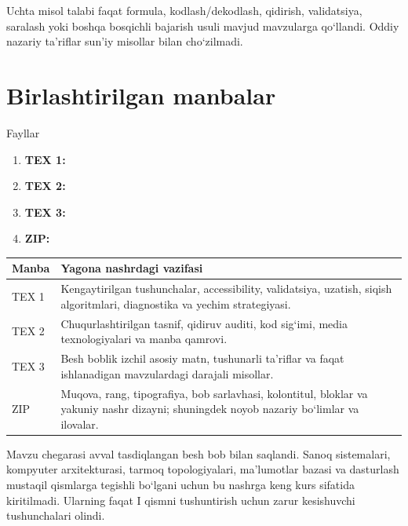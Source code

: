 \documentclass[11pt,a4paper,oneside]{book}
\begin{document}
\begin{exam}
Uchta misol talabi faqat formula, kodlash/dekodlash, qidirish, validatsiya, saralash yoki boshqa bosqichli bajarish usuli mavjud mavzularga qo‘llandi. Oddiy nazariy ta’riflar sun’iy misollar bilan cho‘zilmadi.
\end{exam}

\section*{Birlashtirilgan manbalar}
\begin{sourcebox}{Fayllar}
\small
\begin{enumerate}[leftmargin=8mm,itemsep=.5mm]
\item \textbf{TEX 1:} 
\item \textbf{TEX 2:} 
\item \textbf{TEX 3:} 
\item \textbf{ZIP:} 
\end{enumerate}
\end{sourcebox}

\begin{tabularx}{\textwidth}{@{}L{22mm}Y@{}}
\toprule
\textbf{Manba} & \textbf{Yagona nashrdagi vazifasi}\\
\midrule
TEX 1 & Kengaytirilgan tushunchalar, accessibility, validatsiya, uzatish, siqish algoritmlari, diagnostika va yechim strategiyasi.\\
TEX 2 & Chuqurlashtirilgan tasnif, qidiruv auditi, kod sig‘imi, media texnologiyalari va manba qamrovi.\\
TEX 3 & Besh boblik izchil asosiy matn, tushunarli ta’riflar va faqat ishlanadigan mavzulardagi darajali misollar.\\
ZIP & Muqova, rang, tipografiya, bob sarlavhasi, kolontitul, bloklar va yakuniy nashr dizayni; shuningdek noyob nazariy bo‘limlar va ilovalar.\\
\bottomrule
\end{tabularx}

\begin{extra}
Mavzu chegarasi avval tasdiqlangan besh bob bilan saqlandi. Sanoq sistemalari, kompyuter arxitekturasi, tarmoq topologiyalari, ma’lumotlar bazasi va dasturlash mustaqil qismlarga tegishli bo‘lgani uchun bu nashrga keng kurs sifatida kiritilmadi. Ularning faqat I qismni tushuntirish uchun zarur kesishuvchi tushunchalari olindi.
\end{extra}
\clearpage
\tableofcontents
\clearpage
\end{document}
